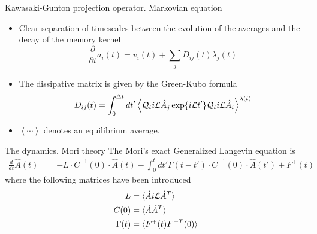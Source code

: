 \documentclass{beamer}
\newcommand{\esc}{\!\cdot\!}
\begin{document}
\begin{frame}{Kawasaki-Gunton projection operator. Markovian equation}
  \begin{itemize}
     \item Clear separation of timescales between the evolution of the averages and the decay of the memory kernel 
\begin{equation}
  \frac{\partial}{\partial t}a_i(t) = v_i(t) + \sum_j D_{ij}(t) \lambda_j(t)
\label{ex2}
\nonumber
\end{equation}
\item The  dissipative matrix  is  given  by  the Green-Kubo  formula
\begin{equation}
D_{ij}(t)=\int_0^{\Delta t} dt'\left\langle 
{\cal Q}_t i{\cal L}\hat{A}_j\exp\{i{\cal L}t'\}{\cal Q}_t i{\cal L}\hat{A}_i
\right\rangle^{\lambda(t)}
\label{dij}
\nonumber
\end{equation}
\item $\left\langle\cdots\right\rangle$ denotes an equilibrium average.
\end{itemize}
\end{frame}

\begin{frame}{The dynamics. Mori theory}
    The \alert{Mori's exact Generalized Langevin equation} \cite{Mori1965} is
\begin{align}
  \frac{d}{dt}\hat{A}(t)= & -L\esc C^{-1}(0)\esc \hat{A} (t) 
  -\int_0^tdt'\Gamma(t-t')\esc  C^{-1}(0)\esc \hat{A} (t') +F^+(t)
\nonumber
\end{align}
where the following matrices have been introduced
\begin{align}
  L&=\langle \hat{A}i{\cal L}\hat{A}^T\rangle \nonumber \\
  C(0)&=\langle \hat{A}\hat{A}^T\rangle \nonumber \\
\Gamma(t)&=\langle F^+(t)F^{+T}(0)\rangle
\nonumber
\end{align}
\end{frame}
\end{document}
